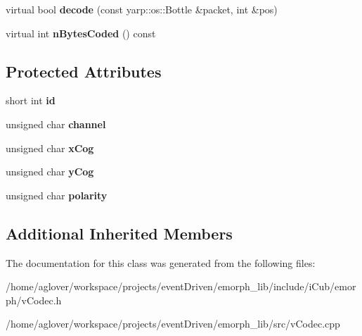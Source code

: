 \begin{DoxyCompactItemize}
\item 
\hypertarget{classemorph_1_1ClusterEvent_a5b360ff84943c3f8306ad1d6698ef347}{virtual bool {\bfseries decode} (const yarp\-::os\-::\-Bottle \&packet, int \&pos)}\label{classemorph_1_1ClusterEvent_a5b360ff84943c3f8306ad1d6698ef347}

\item 
\hypertarget{classemorph_1_1ClusterEvent_a1e134a3e8f53ffe6521e00a0db66ce0e}{virtual int {\bfseries n\-Bytes\-Coded} () const }\label{classemorph_1_1ClusterEvent_a1e134a3e8f53ffe6521e00a0db66ce0e}

\end{DoxyCompactItemize}
\subsection*{Protected Attributes}
\begin{DoxyCompactItemize}
\item 
\hypertarget{classemorph_1_1ClusterEvent_a885cbc53c2b042e3b9a583ad4f09cbe9}{short int {\bfseries id}}\label{classemorph_1_1ClusterEvent_a885cbc53c2b042e3b9a583ad4f09cbe9}

\item 
\hypertarget{classemorph_1_1ClusterEvent_adae97efa4b50b75a2744cf062e5f0903}{unsigned char {\bfseries channel}}\label{classemorph_1_1ClusterEvent_adae97efa4b50b75a2744cf062e5f0903}

\item 
\hypertarget{classemorph_1_1ClusterEvent_aca2e96418697809fa32ae154b4fa02bb}{unsigned char {\bfseries x\-Cog}}\label{classemorph_1_1ClusterEvent_aca2e96418697809fa32ae154b4fa02bb}

\item 
\hypertarget{classemorph_1_1ClusterEvent_aba3d3d54d58bbb43b73d771a86dc64de}{unsigned char {\bfseries y\-Cog}}\label{classemorph_1_1ClusterEvent_aba3d3d54d58bbb43b73d771a86dc64de}

\item 
\hypertarget{classemorph_1_1ClusterEvent_a77f96e40db5aea2b5346d7c38f6d0aaa}{unsigned char {\bfseries polarity}}\label{classemorph_1_1ClusterEvent_a77f96e40db5aea2b5346d7c38f6d0aaa}

\end{DoxyCompactItemize}
\subsection*{Additional Inherited Members}


The documentation for this class was generated from the following files\-:\begin{DoxyCompactItemize}
\item 
/home/aglover/workspace/projects/event\-Driven/emorph\-\_\-lib/include/i\-Cub/emorph/v\-Codec.\-h\item 
/home/aglover/workspace/projects/event\-Driven/emorph\-\_\-lib/src/v\-Codec.\-cpp\end{DoxyCompactItemize}
